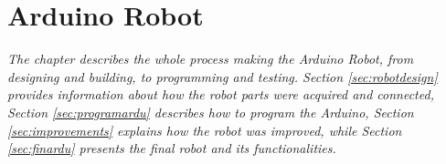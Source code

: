 \chapter{Arduino Robot}
\textit{The chapter describes the whole process making the Arduino Robot, from designing and building, to programming and testing. Section \ref{sec:robotdesign} provides information about how the robot parts were acquired and connected, Section \ref{sec:programardu} describes how to program the Arduino, Section \ref{sec:improvements} explains how the robot was improved, while Section \ref{sec:finardu} presents the final robot and its functionalities.}




